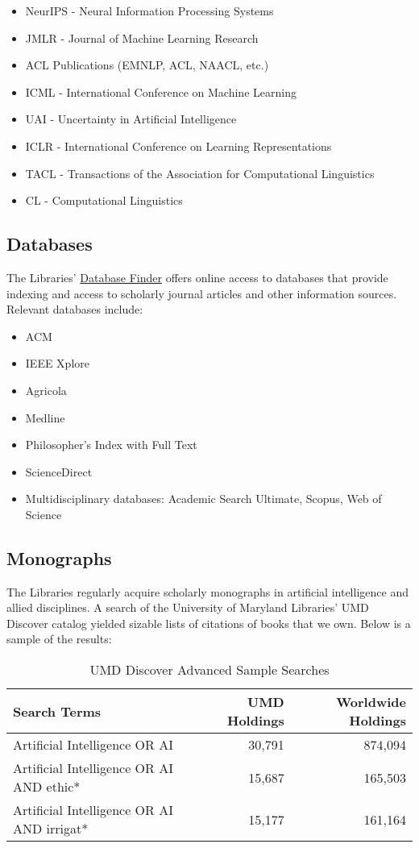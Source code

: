 \begin{itemize}
    \item NeurIPS - Neural Information Processing Systems
    \item JMLR - Journal of Machine Learning Research
    \item ACL Publications (EMNLP, ACL, NAACL, etc.)
    \item ICML - International Conference on Machine Learning
    \item UAI - Uncertainty in Artificial Intelligence
    \item ICLR - International Conference on Learning Representations
    \item TACL - Transactions of the Association for Computational Linguistics
    \item CL - Computational Linguistics
\end{itemize}

\subsection*{Databases}
The Libraries’ \href{https://lib.guides.umd.edu/az.php}{Database Finder} offers online access to databases that provide indexing and access to scholarly journal articles and other information sources. Relevant databases include:
\begin{itemize}
    \item ACM
    \item IEEE Xplore
    \item Agricola
    \item Medline
    \item Philosopher's Index with Full Text
    \item ScienceDirect
    \item Multidisciplinary databases: Academic Search Ultimate, Scopus, Web of Science
\end{itemize}

\subsection*{Monographs}
The Libraries regularly acquire scholarly monographs in artificial intelligence and allied disciplines. A search of the University of Maryland Libraries’ UMD Discover catalog yielded sizable lists of citations of books that we own. Below is a sample of the results:

\begin{table}[h!]
\centering
\begin{tabular}{|l|r|r|}
\hline
\textbf{Search Terms} & \textbf{UMD Holdings} & \textbf{Worldwide Holdings} \\
\hline
Artificial Intelligence OR AI & 30,791 & 874,094 \\
Artificial Intelligence OR AI AND ethic* & 15,687 & 165,503 \\
Artificial Intelligence OR AI AND irrigat* & 15,177 & 161,164 \\
\hline
\end{tabular}
\caption{UMD Discover Advanced Sample Searches}
\end{table}

